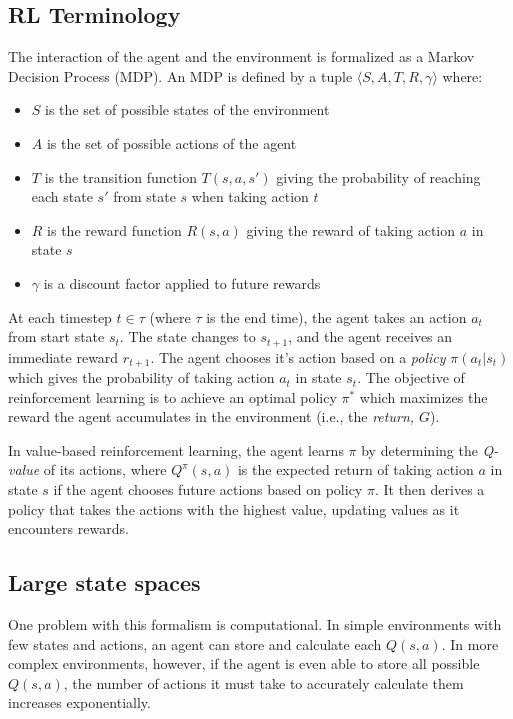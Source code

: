 \documentclass[letterpaper]{article}
\begin{document}
	\subsection{RL Terminology}
	 
	 The interaction of the agent and the environment is formalized as a Markov Decision Process (MDP). An MDP is defined by a tuple $\langle S, A, T, R, \gamma \rangle$ where:
	 \begin{itemize}
	 	\item $S$ is the set of possible states of the environment
	 	\item $A$ is the set of possible actions of the agent
	 	\item $T$ is the transition function $T(s,a,s')$ giving the probability of reaching each state $s'$ from state $s$ when taking action $t$
	 	\item $R$ is the reward function $R(s,a)$ giving the reward of taking action $a$ in state $s$
	 	\item $\gamma$ is a discount factor applied to future rewards
	 \end{itemize}
 	
 	At each timestep $t\in \tau$ (where $\tau$ is the end time), the agent takes an action $a_t$ from start state $s_t$. The state changes to $s_{t+1}$, and the agent receives an immediate reward $r_{t+1}$. The agent chooses it's action based on a \textit{policy} $\pi (a_t|s_t)$ which gives the probability of taking action $a_t$ in state $s_t$. The objective of reinforcement learning is to achieve an optimal policy $\pi^*$ which maximizes the reward the agent accumulates in the environment (i.e., the \textit{return, $G$}). 
 	
 	In value-based reinforcement learning, the agent learns $\pi$ by determining the \textit{Q-value} of its actions, where $Q^\pi(s,a)$ is the expected return of taking action $a$ in state $s$ if the agent chooses future actions based on policy $\pi$. It then derives a policy that takes the actions with the highest value, updating values as it encounters rewards.
 	
 	\subsection{Large state spaces}
 	
 	One problem with this formalism is computational. In simple environments with few states and actions, an agent can store and calculate each $Q(s,a)$. In more complex environments, however, if the agent is even able to store all possible $Q(s,a)$, the number of actions it must take to accurately calculate them increases exponentially.
 	
\end{document}
